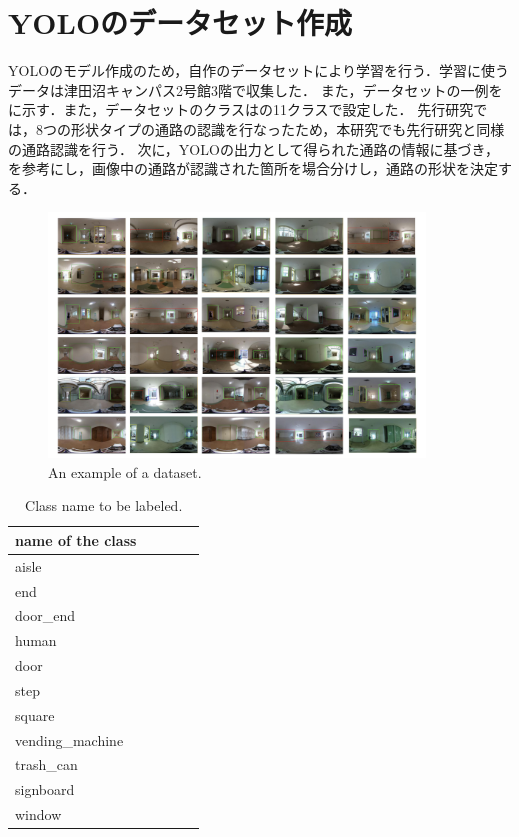 \documentclass[../main]{subfiles}
\begin{document}
        \newpage

        \section{YOLOのデータセット作成}
        YOLOのモデル作成のため，自作のデータセットにより学習を行う．学習に使うデータは津田沼キャンパス2号館3階で収集した．
        また，データセットの一例をに示す．また，データセットのクラスはの11クラスで設定した．
        先行研究では，8つの形状タイプの通路の認識を行なったため，本研究でも先行研究と同様の通路認識を行う．
        次に，YOLOの出力として得られた通路の情報に基づき，を参考にし，画像中の通路が認識された箇所を場合分けし，通路の形状を決定する．

        \begin{figure}[H]
         \centering
         \includegraphics[width=10cm]{../images/dataset_exp.png}
         \caption{An example of a dataset.}
         \label{figure::dataset_fig}
        \end{figure}

        \begin{table}[H]
            \caption{Class name to be labeled.}
            \centering
            \label{table::datasets_table}
            \begin{tabular}{lllll}
            \hline
            name of the class &  &  &  &  \\ 
            \hline \hline
            aisle             &  &  &  &  \\
            end               &  &  &  &  \\
            door\_end         &  &  &  &  \\
            human             &  &  &  &  \\
            door              &  &  &  &  \\
            step              &  &  &  &  \\
            square            &  &  &  &  \\
            vending\_machine  &  &  &  &  \\
            trash\_can        &  &  &  &  \\
            signboard         &  &  &  &  \\
            window            &  &  &  &  \\ 
            \hline
            \end{tabular}
        \end{table}
\end{document}
